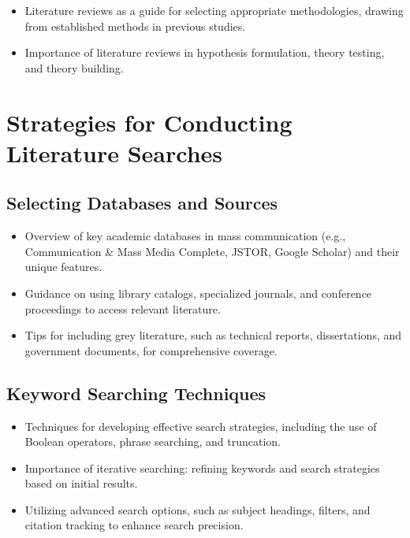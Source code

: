 \documentclass[
]{book}
\begin{document}
\begin{itemize}
\item
  Literature reviews as a guide for selecting appropriate methodologies, drawing from established methods in previous studies.
\item
  Importance of literature reviews in hypothesis formulation, theory testing, and theory building.
\end{itemize}

\hypertarget{strategies-for-conducting-literature-searches}{%
\section*{Strategies for Conducting Literature Searches}\label{strategies-for-conducting-literature-searches}}

\hypertarget{selecting-databases-and-sources}{%
\subsection*{Selecting Databases and Sources}\label{selecting-databases-and-sources}}

\begin{itemize}
\item
  Overview of key academic databases in mass communication (e.g., Communication \& Mass Media Complete, JSTOR, Google Scholar) and their unique features.
\item
  Guidance on using library catalogs, specialized journals, and conference proceedings to access relevant literature.
\item
  Tips for including grey literature, such as technical reports, dissertations, and government documents, for comprehensive coverage.
\end{itemize}

\hypertarget{keyword-searching-techniques}{%
\subsection*{Keyword Searching Techniques}\label{keyword-searching-techniques}}

\begin{itemize}
\item
  Techniques for developing effective search strategies, including the use of Boolean operators, phrase searching, and truncation.
\item
  Importance of iterative searching: refining keywords and search strategies based on initial results.
\item
  Utilizing advanced search options, such as subject headings, filters, and citation tracking to enhance search precision.
\end{itemize}
\end{document}
